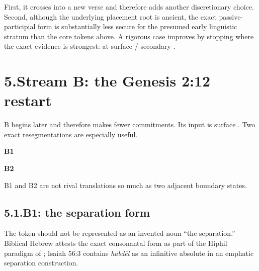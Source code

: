 First, it crosses into a new verse and therefore adds another discretionary choice.  Second, although the underlying placement root is ancient, the exact passive-participial form  is substantially less secure for the presumed early linguistic stratum than the core tokens above.  A rigorous case improves by stopping where the exact evidence is strongest: at surface  / secondary .

\section*{5.\quad Stream B: the Genesis 2:12 restart}

B begins later and therefore makes fewer commitments.  Its input is surface .  Two exact resegmentations are especially useful.

\noindent
\begin{minipage}[t]{0.48\linewidth}
{\centering\textbf{B1}\par}
\end{minipage}
\hfill
\begin{minipage}[t]{0.48\linewidth}
{\centering\textbf{B2}\par}
\end{minipage}

B1 and B2 are not rival translations so much as two adjacent boundary states.

\subsection*{5.1.\quad B1: the separation form}

The token  should not be represented as an invented noun ``the separation.''  Biblical Hebrew attests the exact consonantal form as part of the Hiphil paradigm of ; Isaiah 56:3 contains \textit{habdēl} as an infinitive absolute in an emphatic separation construction.\cite{BDB,JouonMuraoka2006}

